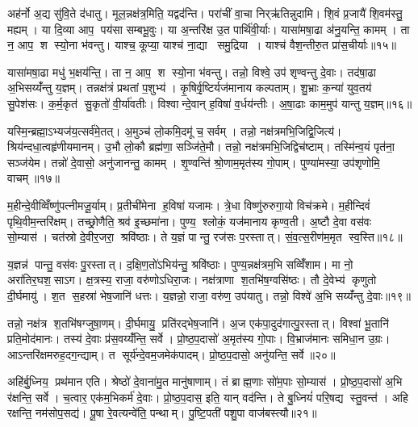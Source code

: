 अह॑र्नो अ॒द्य सु॑वि॒ते द॑धातु। मूल॒न्नक्ष॑त्र॒मिति॒ यद्वद॑न्ति। परा॑चीं वा॒चा निर्‌ऋ॑तिन्नुदामि। शि॒वं प्र॒जायै॑ शि॒वम॑स्तु॒ मह्यम्। या दि॒व्या आप॒ पय॑सा सम्बभू॒वुः। या अ॒न्तरि॑क्ष उ॒त पार्थि॑वी॒र्याः। यासा॑मषा॒ढा अ॑नु॒यन्ति॒ कामम्। ता न॒ आप॒ श स्यो॒ना भ॑वन्तु। याश्च॒ कूप्या॒ याश्च॑ ना॒द्या समु॒द्रिया। याश्च॑ वैश॒न्तीरु॒त प्रा॑स॒चीर्याः॥१५॥

यासा॑मषा॒ढा मधु॑ भ॒क्षय॑न्ति॒। ता न॒ आप॒ श स्यो॒ना भ॑वन्तु। तन्नो॒ विश्वे॒ उप॑ शृण्वन्तु दे॒वाः। तद॑षा॒ढा अ॒भिसय्यँ॑न्तु य॒ज्ञम्। तन्नक्ष॑त्रं प्रथतां प॒शुभ्य॑। कृ॒षिर्वृ॒ष्टिर्यज॑मानाय कल्पताम्। शु॒भ्राः क॒न्या॑ युव॒तय॑ सु॒पेश॑सः। क॒र्म॒कृत॑ सु॒कृतो॑ वी॒र्या॑वतीः। विश्वान्दे॒वान् ह॒विषा॑ व॒र्धय॑न्तीः। अ॒षा॒ढाः काम॒मुप॑ यान्तु य॒ज्ञम्॥१६॥

यस्मि॒न्ब्रह्मा॒ऽभ्यज॑य॒त्सर्व॑मे॒तत्। अ॒मुञ्च॑ लो॒कमि॒दमू॑ च॒ सर्वम्। तन्नो॒ नक्ष॑त्रमभि॒जिद्वि॒जित्य॑। श्रिय॑न्दधा॒त्वहृ॑णीयमानम्। उ॒भौ लो॒कौ ब्रह्म॑णा॒ सञ्जि॑ते॒मौ। तन्नो॒ नक्ष॑त्रमभि॒जिद्विच॑ष्टाम्। तस्मि॑न्व॒यं पृत॑ना॒ सञ्ज॑येम। तन्नो॑ दे॒वासो॒ अनु॑जानन्तु॒ कामम्। शृ॒ण्वन्ति॑ श्रो॒णाम॒मृत॑स्य गो॒पाम्। पुण्या॑मस्या॒ उप॑शृणोमि॒ वाचम्॥१७॥

म॒हीन्दे॒वीव्विँष्णु॑पत्नीमजू॒र्याम्। प्र॒तीची॑मेना ह॒विषा॑ यजामः। त्रे॒धा विष्णु॑रुरुगा॒यो विच॑क्रमे। म॒हीन्दिवं॑ पृथि॒वीम॒न्तरि॑क्षम्। तच्छ्रो॒णैति॒ श्रव॑ इ॒च्छमा॑ना। पुण्य॒ श्लोकं॒ यज॑मानाय कृण्व॒ती। अ॒ष्टौ दे॒वा वस॑वः सो॒म्यास॑। चत॑स्रो दे॒वीर॒जरा॒ श्रवि॑ष्ठाः। ते य॒ज्ञं पान्तु॒ रज॑सः प॒रस्तात्। सं॒व॒त्स॒रीण॑म॒मृत स्व॒स्ति॥१८॥

य॒ज्ञन्न॑ पान्तु॒ वस॑वः पु॒रस्तात्। द॒क्षि॒ण॒तो॑ऽभिय॑न्तु॒ श्रवि॑ष्ठाः। पुण्य॒न्नक्ष॑त्रम॒भि सव्विँ॑शाम। मा नो॒ अरा॑तिर॒घश॒साऽग\sn{}। क्ष॒त्रस्य॒ राजा॒ वरु॑णोऽधिरा॒जः। नक्ष॑त्राणा श॒तभि॑ष॒ग्वसि॑ष्ठः। तौ दे॒वेभ्य॑ कृणुतो दी॒र्घमायु॑। श॒त स॒हस्रा॑ भेष॒जानि॑ धत्तः। य॒ज्ञन्नो॒ राजा॒ वरु॑ण॒ उप॑यातु। तन्नो॒ विश्वे॑ अ॒भि सय्यँ॑न्तु दे॒वाः॥१९॥

तन्नो॒ नक्ष॑त्र श॒तभि॑षग्जुषा॒णम्। दी॒र्घमायु॒ प्रति॑रद्भेष॒जानि॑। अ॒ज एक॑पा॒दुद॑गात्पु॒रस्तात्। विश्वा॑ भू॒तानि॑ प्रति॒मोद॑मानः। तस्य॑ दे॒वाः प्र॑स॒वय्यँ॑न्ति॒ सर्वे। प्रो॒ष्ठ॒प॒दासो॑ अ॒मृत॑स्य गो॒पाः। वि॒भ्राज॑मानः समिधा॒न उ॒ग्रः। आऽन्तरि॑क्षमरुह॒दग॒न्द्याम्। त सूर्य॑न्दे॒वम॒जमेक॑पादम्। प्रो॒ष्ठ॒प॒दासो॒ अनु॑यन्ति॒ सर्वे॥२०॥

अहि॑र्बु॒ध्निय॒ प्रथ॑मान एति। श्रेष्ठो॑ दे॒वाना॑मु॒त मानु॑षाणाम्। तं ब्राह्म॒णाः सो॑म॒पाः सो॒म्यास॑। प्रो॒ष्ठ॒प॒दासो॑ अ॒भि र॑क्षन्ति॒ सर्वे। च॒त्वार॒ एक॑म॒भिकर्म॑ दे॒वाः। प्रो॒ष्ठ॒प॒दास॒ इति॒ यान् वद॑न्ति। ते बु॒ध्नियं॑ परि॒षद्य स्तु॒वन्त॑। अहि रक्षन्ति॒ नम॑सोप॒सद्य॑। पू॒षा रे॒वत्यन्वे॑ति॒ पन्थाम्। पु॒ष्टि॒पती॑ पशु॒पा वाज॑बस्त्यौ॥२१॥

